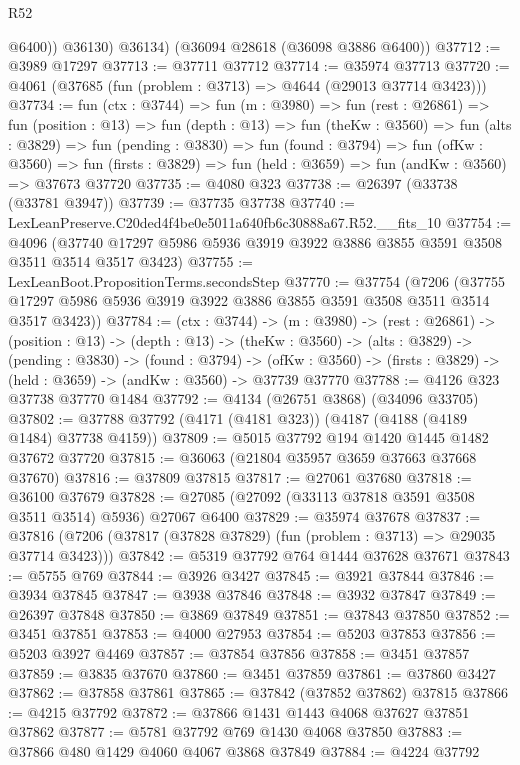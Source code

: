 \begin{lexlean}{R52}
\begin{coremodule}
            @6400))
        @36130)
      @36134)
    (@36094 @28618 (@36098 @3886 @6400))
@37712 := @3989 @17297
@37713 := @37711 @37712
@37714 := @35974 @37713
@37720 := @4061 (@37685 (fun (problem : @3713) => @4644 (@29013 @37714 @3423)))
@37734 := fun (ctx : @3744) =>
  fun (m : @3980) =>
  fun (rest : @26861) =>
  fun (position : @13) =>
  fun (depth : @13) =>
  fun (theKw : @3560) =>
  fun (alts : @3829) =>
  fun (pending : @3830) =>
  fun (found : @3794) =>
  fun (ofKw : @3560) =>
  fun (firsts : @3829) => fun (held : @3659) => fun (andKw : @3560) => @37673 @37720
@37735 := @4080 @323
@37738 := @26397 (@33738 (@33781 @3947))
@37739 := @37735 @37738
@37740 := LexLeanPreserve.C20ded4f4be0e5011a640fb6c30888a67.R52.__fits_10
@37754 := @4096
    (@37740 @17297 @5986 @5936 @3919 @3922 @3886 @3855 @3591 @3508 @3511 @3514 @3517 @3423)
@37755 := LexLeanBoot.PropositionTerms.secondsStep
@37770 := @37754
    (@7206 (@37755 @17297 @5986 @5936 @3919 @3922 @3886 @3855 @3591 @3508 @3511 @3514 @3517 @3423))
@37784 := (ctx : @3744) ->
  (m : @3980) ->
  (rest : @26861) ->
  (position : @13) ->
  (depth : @13) ->
  (theKw : @3560) ->
  (alts : @3829) ->
  (pending : @3830) ->
  (found : @3794) ->
  (ofKw : @3560) -> (firsts : @3829) -> (held : @3659) -> (andKw : @3560) -> @37739 @37770
@37788 := @4126 @323 @37738 @37770 @1484
@37792 := @4134 (@26751 @3868) (@34096 @33705)
@37802 := @37788 @37792 (@4171 (@4181 @323)) (@4187 (@4188 (@4189 @1484) @37738 @4159))
@37809 := @5015 @37792 @194 @1420 @1445 @1482 @37672 @37720
@37815 := @36063 (@21804 @35957 @3659 @37663 @37668 @37670)
@37816 := @37809 @37815
@37817 := @27061 @37680
@37818 := @36100 @37679
@37828 := @27085 (@27092 (@33113 @37818 @3591 @3508 @3511 @3514) @5936) @27067 @6400
@37829 := @35974 @37678
@37837 := @37816 (@7206 (@37817 (@37828 @37829) (fun (problem : @3713) => @29035 @37714 @3423)))
@37842 := @5319 @37792 @764 @1444 @37628 @37671
@37843 := @5755 @769
@37844 := @3926 @3427
@37845 := @3921 @37844
@37846 := @3934 @37845
@37847 := @3938 @37846
@37848 := @3932 @37847
@37849 := @26397 @37848
@37850 := @3869 @37849
@37851 := @37843 @37850
@37852 := @3451 @37851
@37853 := @4000 @27953
@37854 := @5203 @37853
@37856 := @5203 @3927 @4469
@37857 := @37854 @37856
@37858 := @3451 @37857
@37859 := @3835 @37670
@37860 := @3451 @37859
@37861 := @37860 @3427
@37862 := @37858 @37861
@37865 := @37842 (@37852 @37862) @37815
@37866 := @4215 @37792
@37872 := @37866 @1431 @1443 @4068 @37627 @37851 @37862
@37877 := @5781 @37792 @769 @1430 @4068 @37850
@37883 := @37866 @480 @1429 @4060 @4067 @3868 @37849
@37884 := @4224 @37792

\end{coremodule}
\end{lexlean}

